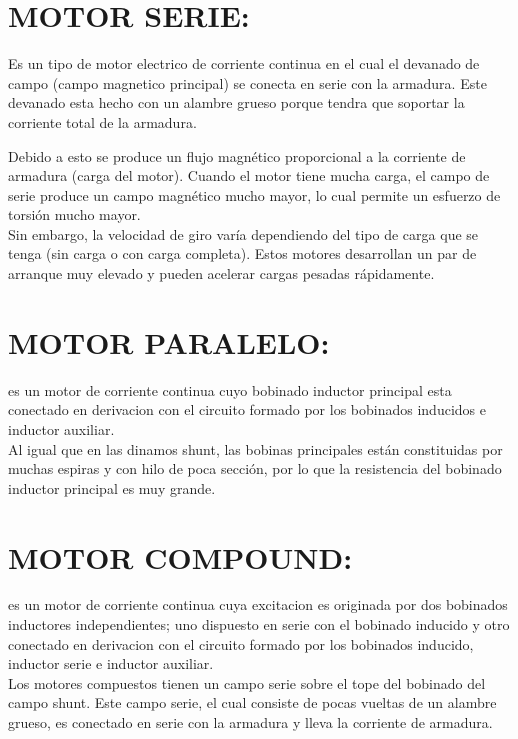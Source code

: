 \documentclass[11pt,a4paper]{article}
\begin{document}
\section{MOTOR SERIE:}
Es un tipo de motor electrico de corriente continua en el cual el devanado de campo (campo magnetico principal) se conecta en serie con la armadura. Este devanado esta hecho con un alambre grueso porque tendra que soportar la corriente total de la armadura.

Debido a esto se produce un flujo magnético proporcional a la corriente de armadura (carga del motor). Cuando el motor tiene mucha carga, el campo de serie produce un campo magnético mucho mayor, lo cual permite un esfuerzo de torsión mucho mayor.\\
Sin embargo, la velocidad de giro varía dependiendo del tipo de carga que se tenga (sin carga o con carga completa). Estos motores desarrollan un par de arranque muy elevado y pueden acelerar cargas pesadas rápidamente.

\section{MOTOR PARALELO:}
es un motor de corriente continua cuyo bobinado inductor principal esta conectado en derivacion con el circuito formado por los bobinados inducidos e inductor auxiliar.\\
Al igual que en las dinamos shunt, las bobinas principales están constituidas por muchas espiras y con hilo de poca sección, por lo que la resistencia del bobinado inductor principal es muy grande.

\section{MOTOR COMPOUND:}
es un motor de corriente continua cuya excitacion es originada por dos bobinados inductores independientes; uno dispuesto en serie con el bobinado inducido y otro conectado en derivacion con el circuito formado por los bobinados inducido, inductor serie e inductor auxiliar.\\
Los motores compuestos tienen un campo serie sobre el tope del bobinado del campo shunt. Este campo serie, el cual consiste de pocas vueltas de un alambre grueso, es conectado en serie con la armadura y lleva la corriente de armadura.
\end{document}
